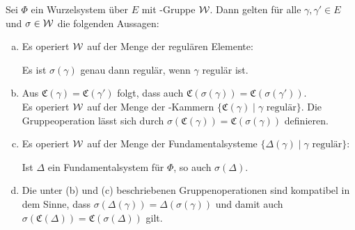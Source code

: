 \begin{prop}
  \label{prop:groupOp}
  Sei $\Phi$ ein Wurzelsystem über $E$ mit \weyl\hyp{}Gruppe $\mathcal{W}$.
  Dann gelten für alle $\gamma, \gamma' \in E$ und $\sigma \in \mathcal{W}$ die folgenden Aussagen:
  \begin{enumerate}[(a)]
    \item Es operiert $\mathcal{W}$ auf der Menge der regulären Elemente: 
      \begin{addmargin}[2em]{2em}
        Es ist $\sigma(\gamma)$ genau dann regulär, wenn $\gamma$ regulär ist.
      \end{addmargin}
      
    \item Aus $\mathfrak{C}(\gamma) = \mathfrak{C}(\gamma')$ folgt, dass auch $\mathfrak{C}(\sigma(\gamma)) = \mathfrak{C}(\sigma(\gamma'))$. \\
      Es operiert $\mathcal{W}$ auf der Menge der \weyl\hyp{}Kammern $\{\mathfrak{C}(\gamma) \mid \gamma \text{ regulär}\}$. Die Gruppeoperation lässt sich durch $ \sigma(\mathfrak{C}(\gamma)) = \mathfrak{C}(\sigma(\gamma))$ definieren.

    \item Es operiert $\mathcal{W}$ auf der Menge der Fundamentalsysteme $\{\Delta(\gamma) \mid \gamma \text{ regulär}\}$: 
      \begin{addmargin}[2em]{2em}
        Ist $\Delta$ ein Fundamentalsystem für $\Phi$, so auch $\sigma(\Delta)$. 
      \end{addmargin}

    \item Die unter (b) und (c) beschriebenen Gruppenoperationen sind kompatibel in dem Sinne, dass 
      $\sigma(\Delta(\gamma)) = \Delta(\sigma(\gamma))$
      und damit auch
      $\sigma(\mathfrak{C}(\Delta)) = \mathfrak{C}(\sigma(\Delta))$
      gilt.
  \end{enumerate}
\end{prop}


